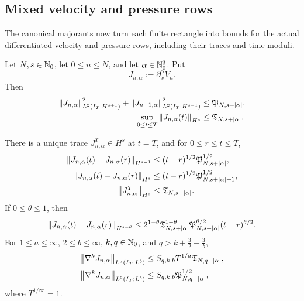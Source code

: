 \subsection{Mixed velocity and pressure rows}

The canonical majorants now turn each finite rectangle into bounds for the
actual differentiated velocity and pressure rows, including their traces and
time moduli.

\begin{theorem}
\label{thm:qc-mixed-jet}
\begin{samepage}
Let \(N,s\in\mathbb N_0\), let \(0\le n\le N\), and let
\(\alpha\in\mathbb N_0^3\).  Put
\[
 J_{n,\alpha}:=\partial_x^\alpha V_n.
\]
Then
\begin{align}
 \left\lVert J_{n,\alpha}\right\rVert_{L^2(I_T;H^{s+1})}^2
 +\left\lVert J_{n+1,\alpha}\right\rVert_{L^2(I_T;H^{s-1})}^2
 &\le \mathfrak P_{N,s+|\alpha|},
 \label{eq:qc-mixed-adjacent}\\
 \sup_{0\le t\le T}\left\lVert J_{n,\alpha}(t)\right\rVert_{H^s}
 &\le \mathfrak T_{N,s+|\alpha|}.
 \label{eq:qc-mixed-trace}
\end{align}
\end{samepage}
There is a unique trace \(J_{n,\alpha}^T\in H^s\) at \(t=T\), and
for \(0\le r\le t\le T\),
\begin{align}
 \left\lVert J_{n,\alpha}(t)-J_{n,\alpha}(r)\right\rVert_{H^{s-1}}
 &\le (t-r)^{1/2}\mathfrak P_{N,s+|\alpha|}^{1/2},
 \label{eq:qc-mixed-low-modulus}\\
 \left\lVert J_{n,\alpha}(t)-J_{n,\alpha}(r)\right\rVert_{H^s}
 &\le (t-r)^{1/2}
        \mathfrak P_{N,s+|\alpha|+1}^{1/2},
 \label{eq:qc-mixed-strong-modulus}\\
 \left\lVert J_{n,\alpha}^T\right\rVert_{H^s}
 &\le \mathfrak T_{N,s+|\alpha|}.
 \label{eq:qc-mixed-endpoint-size}
\end{align}
If \(0\le\theta\le1\), then
\begin{equation}
 \left\lVert J_{n,\alpha}(t)-J_{n,\alpha}(r)\right\rVert_{H^{s-\theta}}
 \le
 2^{1-\theta}
 \mathfrak T_{N,s+|\alpha|}^{1-\theta}
 \mathfrak P_{N,s+|\alpha|}^{\theta/2}
 (t-r)^{\theta/2}.
 \label{eq:qc-mixed-interpolated-modulus}
\end{equation}
For \(1\le a\le\infty\), \(2\le b\le\infty\),
\(k,q\in\mathbb N_0\), and
\(q>k+\frac32-\frac3b\),
\begin{align}
 \left\lVert \nabla^kJ_{n,\alpha}\right\rVert_{L^a(I_T;L^b)}
 &\le S_{q,k,b}T^{1/a}\mathfrak T_{N,q+|\alpha|},
 \label{eq:qc-mixed-la-lb}\\
 \left\lVert \nabla^kJ_{n,\alpha}\right\rVert_{L^2(I_T;L^b)}
 &\le S_{q,k,b}\mathfrak P_{N,q+|\alpha|}^{1/2},
 \label{eq:qc-mixed-l2-lb}
\end{align}
where \(T^{1/\infty}=1\).
\end{theorem}

